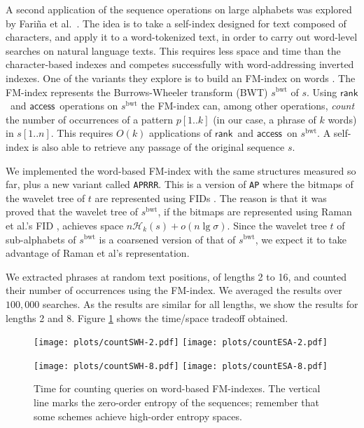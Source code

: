 \documentclass[11pt]{article}
\newcommand{\access}
    {\ensuremath{\mathsf{access}}}
\newcommand{\rank}
    {\ensuremath{\mathsf{rank}}}
\newcommand{\HH}{\mathcal{H}}
\newcommand{\Hk}{\HH_k}
\begin{document}
A second application of the sequence operations on large alphabets was
explored by Fari\~na et al.~\cite{FBNCPR11}. The idea is to take 
a self-index \cite{NM07} designed for text composed of characters, and apply 
it to a word-tokenized text, in order to carry out word-level searches on
natural language texts. This requires less space and time than the
character-based indexes and competes successfully with word-addressing
inverted indexes. One of the variants they explore is to build an FM-index 
\cite{FM05,FMMN07} on words \cite{CN08}. The FM-index represents the
Burrows-Wheeler transform (BWT) \cite{BW94} $s^\textrm{bwt}$ of $s$.
Using \rank\ and \access\ operations on $s^\textrm{bwt}$ the FM-index can, 
among other operations, {\em count} the number of occurrences of a pattern 
$p[1..k]$ (in our case, a phrase of $k$ words) in $s[1..n]$. This requires
$O(k)$ applications of \rank\ and \access\ on $s^\textrm{bwt}$. A self-index 
is also able to retrieve any passage of the original sequence $s$.

We implemented the word-based FM-index with the same structures measured so 
far, plus a new variant called \verb|APRRR|. This is a version of \verb|AP| 
where the bitmaps of the wavelet tree of $t$ are represented using FIDs
\cite{RRR02}. The reason is that it was proved \cite{MN07impl} that the
wavelet tree of $s^\textrm{bwt}$, if the bitmaps are represented using
Raman et al.'s FID \cite{RRR02}, achieves space $n\Hk(s)+o(n\lg\sigma)$.
Since the wavelet tree $t$ of sub-alphabets of $s^\textrm{bwt}$ is a 
coarsened version of that of $s^\textrm{bwt}$, we expect it to take advantage
of Raman et al's representation.

We extracted phrases at random text positions, of lengths 2 to 16, and 
counted their number of occurrences using the FM-index. We averaged the
results over $100{,}000$ searches. As the results
are similar for all lengths, we show the results for lengths 2 and 8.
Figure \ref{fig:count} shows the time/space tradeoff obtained. 

\begin{figure}[tb]
\centerline{\texttt{[image: plots/countSWH-2.pdf]}
\texttt{[image: plots/countESA-2.pdf]}}

\centerline{\texttt{[image: plots/countSWH-8.pdf]}
\texttt{[image: plots/countESA-8.pdf]}}
\caption{Time for counting queries on word-based FM-indexes. The vertical line marks the zero-order entropy of the sequences; remember that some schemes achieve high-order entropy spaces.}
\label{fig:count}
\end{figure}
\end{document}
